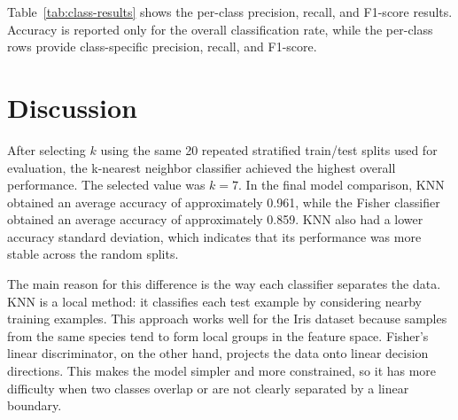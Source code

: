 \documentclass[11pt,a4paper]{article}
\begin{document}
Table~\ref{tab:class-results} shows the per-class precision, recall, and F1-score results. Accuracy is reported only for the overall classification rate, while the per-class rows provide class-specific precision, recall, and F1-score.

\begin{table}[H]
\centering
\caption{Per-class classification results across 20 stratified random splits.}
\label{tab:class-results}
\end{table}

\section{Discussion}

After selecting \(k\) using the same 20 repeated stratified train/test splits used for evaluation, the k-nearest neighbor classifier achieved the highest overall performance. The selected value was \(k = 7\). In the final model comparison, KNN obtained an average accuracy of approximately 0.961, while the Fisher classifier obtained an average accuracy of approximately 0.859. KNN also had a lower accuracy standard deviation, which indicates that its performance was more stable across the random splits.

The main reason for this difference is the way each classifier separates the data. KNN is a local method: it classifies each test example by considering nearby training examples. This approach works well for the Iris dataset because samples from the same species tend to form local groups in the feature space. Fisher's linear discriminator, on the other hand, projects the data onto linear decision directions. This makes the model simpler and more constrained, so it has more difficulty when two classes overlap or are not clearly separated by a linear boundary.
\end{document}
